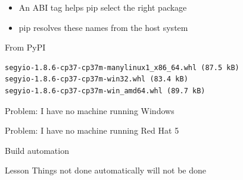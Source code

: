 \documentclass[pdf]{beamer}
\begin{document}
\begin{frame}[fragile]
    \begin{block}{}
        \begin{itemize}
            \item An ABI tag helps pip select the right package
            \item pip resolves these names from the host system
        \end{itemize}
    \end{block}

    \begin{block}{From PyPI}
        \begin{verbatim}
segyio-1.8.6-cp37-cp37m-manylinux1_x86_64.whl (87.5 kB)
segyio-1.8.6-cp37-cp37m-win32.whl (83.4 kB)
segyio-1.8.6-cp37-cp37m-win_amd64.whl (89.7 kB)
        \end{verbatim}
    \end{block}

\end{frame}

\begin{frame}
    Problem: I have no machine running Windows
\end{frame}

\begin{frame}
    Problem: I have no machine running Red Hat 5
\end{frame}

\begin{frame}{Build automation}
    \begin{block}{Lesson}
        Things not done automatically will not be done
    \end{block}
\end{frame}
\end{document}

